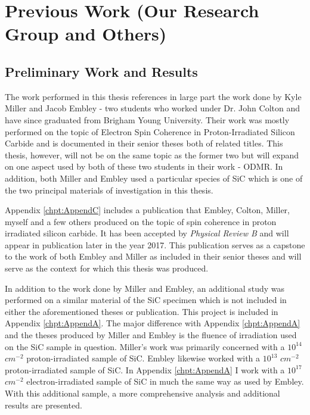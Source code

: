 \documentclass[oneside, astronomy, noacknowlegments]{BYUPhys}
\begin{document}
\section{Previous Work (Our Research Group and Others)}

\subsection{Preliminary Work and Results}

The work performed in this thesis references in large part the work done by Kyle Miller and Jacob Embley - two students who worked under Dr. John Colton and have since graduated from Brigham Young University. Their work was mostly performed on the topic of Electron Spin Coherence in Proton-Irradiated Silicon Carbide and is documented in their senior theses both of related titles. This thesis, however, will not be on the same topic as the former two but will expand on one aspect used by both of these two students in their work - ODMR. In addition, both Miller and Embley used a particular species of SiC which is one of the two principal materials of investigation in this thesis.

Appendix \ref{chpt:AppendC} includes a publication that Embley, Colton, Miller, myself and a few others produced on the topic of spin coherence in proton irradiated silicon carbide. It has been accepted by \textit{Physical Review B} and will appear in publication later in the year 2017. This publication serves as a capstone to the work of both Embley and Miller as included in their senior theses and will serve as the context for which this thesis was produced.

In addition to the work done by Miller and Embley, an additional study was performed on a similar material of the SiC specimen which is not included in either the aforementioned theses or publication. This project is included in Appendix \ref{chpt:AppendA}. The major difference with Appendix \ref{chpt:AppendA} and the theses produced by Miller and Embley is the fluence of irradiation used on the SiC sample in question. Miller's work was primarily concerned with a $10^{14}$ $cm^{-2}$ proton-irradiated sample of SiC. Embley likewise worked with a $10^{13}$ $cm^{-2}$ proton-irradiated sample of SiC. In Appendix \ref{chpt:AppendA} I work with a $10^{17}$ $cm^{-2}$ electron-irradiated sample of SiC in much the same way as used by Embley. With this additional sample, a more comprehensive analysis and additional results are presented.
\end{document}
